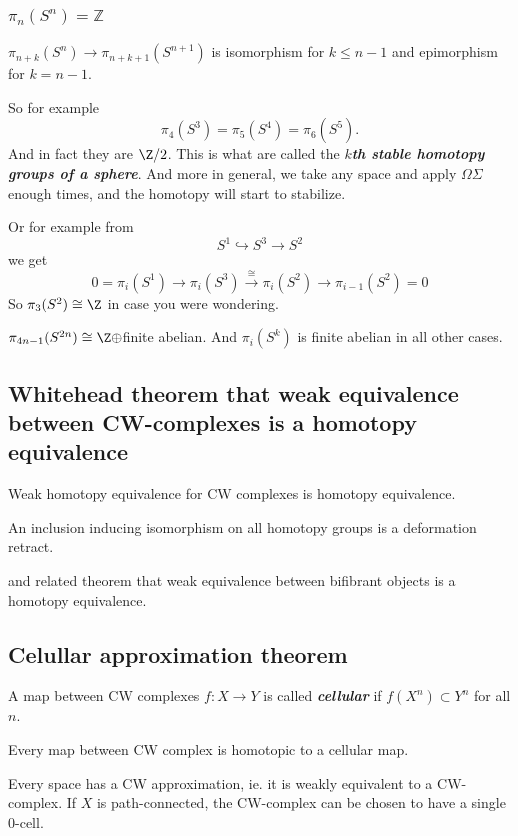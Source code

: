 \begin{remark}
\subsubsection{$\pi_{n}(S^{n})=\mathbb{Z}$}
\begin{coro}
	$\pi_{n+k}(S^n)\to\pi_{n+k+1}(S^{n+1})$ is isomorphism for $k\leq n-1$ and epimorphism for $k=n-1$.
\end{coro}
So for example
\[\pi_4(S^3)=\pi_5(S^4)=\pi_6(S^5).\]
And in fact they are $\Z/2$. This is what are called the \textbf{\textit{$k$th stable homotopy groups of a sphere}}. And more in general, we take any space and apply $\Omega\Sigma$ enough times, and the homotopy will start to stabilize.

Or for example from
\[S^1\hookrightarrow S^3\to S^2\]
we get
\[0=\pi_i(S^1)\to \pi_i(S^3)\overset{\cong}{\to}\pi_i(S^2)\to\pi_{i-1}(S^2)=0\]
So $\pi_3(S^2)\cong\Z$ in case you were wondering.
\begin{claim}[Serre]
	$\pi_{4n-1}(S^{2n})\cong\Z\oplus$finite abelian. And $\pi_i(S^k)$ is finite abelian in all other cases.
\end{claim}

\subsection{Whitehead theorem that weak equivalence between CW-complexes is a homotopy equivalence}

\begin{thm}[Whitehead]
	Weak homotopy equivalence for CW complexes is homotopy equivalence.

	An inclusion inducing isomorphism on all homotopy groups is a deformation retract.
\end{thm}


and related theorem that weak equivalence between bifibrant objects is a homotopy equivalence.
\subsection{Celullar approximation theorem}

\begin{defn}
	A map between CW complexes $f:X\to Y$ is called \textit{\textbf{cellular}} if $f(X^{n})\subset Y^{n}$ for all $n$.
\end{defn}
\begin{thm}
	Every map between CW complex is homotopic to a cellular map.
\end{thm}
\begin{thm}[CW approximation]
	Every space has a CW approximation, ie. it is weakly equivalent to a CW-complex.	
	If $X$ is path-connected, the CW-complex can be chosen to have a single 0-cell.


\end{thm}
\end{remark}
